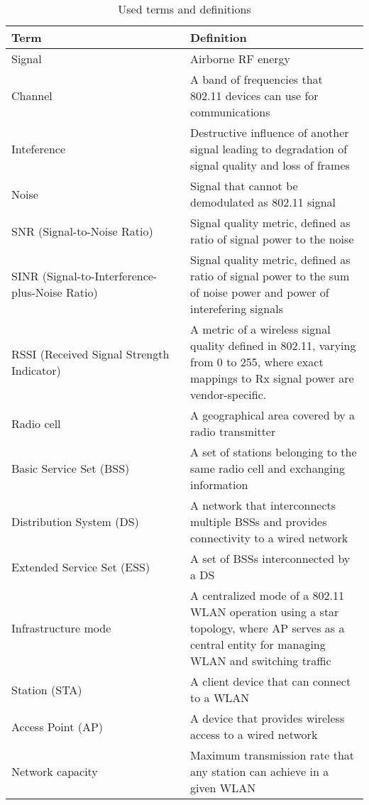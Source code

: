\makeatletter
\let\@currsize\normalsize
\makeatother
\label{defs_table}
\begin{table}[h]
    \centering
    \begin{tabular}{| p{0.5\linewidth} | p{0.5\linewidth} |}\hline
        \textbf{Term} & \textbf{Definition} \\ \hline
        Signal & Airborne RF energy \\
        \hline
        Channel & A band of frequencies that 802.11 devices can use for communications \cite{AuthoritativeDictionaryIEEE2000} \\
        \hline
        Inteference & Destructive influence of another signal leading to degradation of signal quality and loss of frames \\
        \hline
        Noise & Signal that cannot be demodulated as 802.11 signal \\
        \hline
        SNR (Signal-to-Noise Ratio) & Signal quality metric, defined as ratio of signal power to the noise \\
        \hline
        SINR (Signal-to-Interference-plus-Noise Ratio) & Signal quality metric, defined as ratio of signal power to the sum of noise power and power of interefering signals \\
        \hline
        RSSI (Received Signal Strength Indicator) & A metric of a wireless signal quality defined in 802.11, varying from 0 to 255, where exact mappings to Rx signal power are vendor-specific. \\
        \hline
        Radio cell & A geographical area covered by a radio transmitter \cite{tanenbaumComputerNetworks2020} \\
        \hline
        Basic Service Set (BSS) & A set of stations belonging to the same radio cell and exchanging information \cite{konsgenSpectrumManagementAlgorithms2010} \\
        \hline
        Distribution System (DS) & A network that interconnects multiple BSSs and provides connectivity to a wired network \cite{konsgenSpectrumManagementAlgorithms2010} \\
        \hline
        Extended Service Set (ESS) & A set of BSSs interconnected by a DS \cite{konsgenSpectrumManagementAlgorithms2010} \\
        \hline
        Infrastructure mode & A centralized mode of a 802.11 WLAN operation using a star topology, where AP serves as a central entity for managing WLAN and switching traffic \\
        \hline
        Station (STA) & A client device that can connect to a WLAN \\
        \hline
        Access Point (AP) & A device that provides wireless access to a wired network \\
        \hline
        Network capacity & Maximum transmission rate that any station can achieve in a given WLAN \\
        \hline
    \end{tabular}
    \caption{Used terms and definitions}
    \label{tab:my_label}
\end{table}

